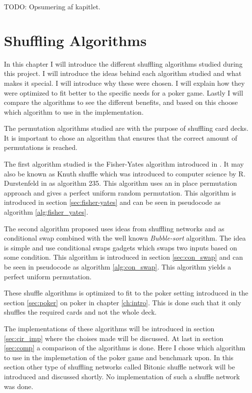 \documentclass[twoside,11pt,openright]{report}
\newcommand{\todo}[1]{}
\renewcommand{\todo}[1]{{\color{red} TODO: {#1}} \\}
\begin{document}
\bigskip

\todo{Opsumering af kapitlet.}



\chapter{Shuffling Algorithms}
\label{ch:shuffle}
In this chapter I will introduce the different shuffling algorithms studied during this project. I will introduce the ideas behind each algorithm studied and what makes it special. I will introduce why these were chosen. I will explain how they were optimized to fit better to the specific needs for a poker game. Lastly I will compare the algorithms to see the different benefits, and based on this choose which algorithm to use in the implementation.

The permutation algorithms studied are with the purpose of shuffling card decks. It is important to chose an algorithm that ensures that the correct amount of permutations is reached.

The first algorithm studied is the Fisher-Yates algorithm introduced in . It may also be known as Knuth shuffle which was introduced to computer science by R. Durstenfeld in  as algorithm 235. This algorithm uses an in place permutation approach and gives a perfect uniform random permutation. This algorithm is introduced in section \ref{sec:fisher-yates} and can be seen in pseudocode as algorithm \ref{alg:fisher_yates}.

The second algorithm proposed uses ideas from shuffling networks and  as conditional swap combined with the well known \textit{Bubble-sort} algorithm. The idea is simple and use conditional swaps gadgets which swaps two inputs based on some condition. This algorithm is introduced in section \ref{sec:con_swap} and can be seen in pseudocode as algorithm \ref{alg:con_swap}. This algorithm yields a perfect uniform permutation.

These shuffle algorithms is optimized to fit to the poker setting introduced in the section \ref{sec:poker} on poker in chapter \ref{ch:intro}. This is done such that it only shuffles the required cards and not the whole deck.

The implementations of these algorithms will be introduced in section \ref{sec:cir_imp} where the choises made will be discussed. At last in section \ref{sec:comp} a comparison of the algorithms is done. Here I chose which algorithm to use in the implemetation of the poker game and benchmark upon. In this section other type of shuffling networks called Bitonic shuffle network will be introduced and discussed shortly. No implementation of such a shuffle network was done.
\end{document}
